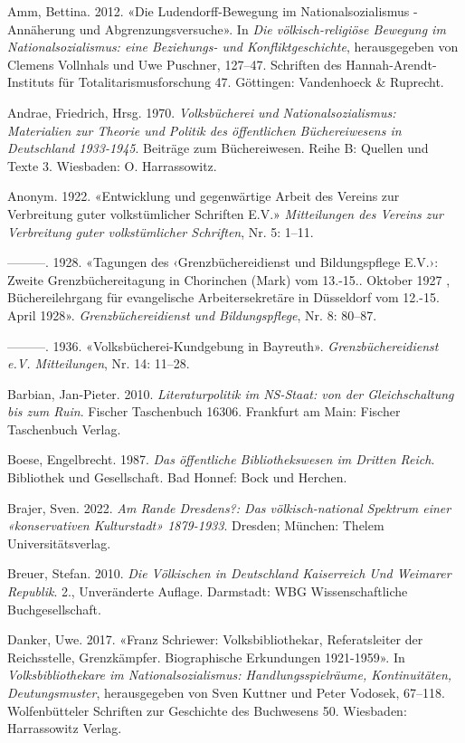 \documentclass[a4paper,
fontsize=11pt,
oneside,
numbers=noperiodatend,
parskip=half-,
bibliography=totoc,
final
]{scrartcl}
\begin{document}
Amm, Bettina. 2012. «Die Ludendorff-Bewegung im Nationalsozialismus -
Annäherung und Abgrenzungsversuche». In \emph{Die völkisch-religiöse
Bewegung im Nationalsozialismus: eine Beziehungs- und
Konfliktgeschichte}, herausgegeben von Clemens Vollnhals und Uwe
Puschner, 127--47. Schriften des Hannah-Arendt-Instituts für
Totalitarismusforschung 47. Göttingen: Vandenhoeck \& Ruprecht.

Andrae, Friedrich, Hrsg. 1970. \emph{Volksbücherei und
Nationalsozialismus: Materialien zur Theorie und Politik des
öffentlichen Büchereiwesens in Deutschland 1933-1945}. Beiträge zum
Büchereiwesen. Reihe B: Quellen und Texte 3. Wiesbaden: O. Harrassowitz.

Anonym. 1922. «Entwicklung und gegenwärtige Arbeit des Vereins zur
Verbreitung guter volkstümlicher Schriften E.V.» \emph{Mitteilungen des
Vereins zur Verbreitung guter volkstümlicher Schriften}, Nr. 5: 1--11.

---------. 1928. «Tagungen des ‹Grenzbüchereidienst und Bildungspflege
E.V.›: Zweite Grenzbüchereitagung in Chorinchen (Mark) vom 13.-15..
Oktober 1927 , Büchereilehrgang für evangelische Arbeitersekretäre in
Düsseldorf vom 12.-15. April 1928». \emph{Grenzbüchereidienst und
Bildungspflege}, Nr. 8: 80--87.

---------. 1936. «Volksbücherei-Kundgebung in Bayreuth».
\emph{Grenzbüchereidienst e.V. Mitteilungen}, Nr. 14: 11--28.

Barbian, Jan-Pieter. 2010. \emph{Literaturpolitik im NS-Staat: von der
Gleichschaltung bis zum Ruin}. Fischer Taschenbuch 16306. Frankfurt am
Main: Fischer Taschenbuch Verlag.

Boese, Engelbrecht. 1987. \emph{Das öffentliche Bibliothekswesen im
Dritten Reich}. Bibliothek und Gesellschaft. Bad Honnef: Bock und
Herchen.

Brajer, Sven. 2022. \emph{Am Rande Dresdens?: Das völkisch-national
Spektrum einer «konservativen Kulturstadt» 1879-1933}. Dresden; München:
Thelem Universitätsverlag.

Breuer, Stefan. 2010. \emph{Die Völkischen in Deutschland Kaiserreich
Und Weimarer Republik}. 2., Unveränderte Auflage. Darmstadt: WBG
Wissenschaftliche Buchgesellschaft.

Danker, Uwe. 2017. «Franz Schriewer: Volksbibliothekar, Referatsleiter
der Reichsstelle, Grenzkämpfer. Biographische Erkundungen 1921-1959». In
\emph{Volksbibliothekare im Nationalsozialismus: Handlungsspielräume,
Kontinuitäten, Deutungsmuster}, herausgegeben von Sven Kuttner und Peter
Vodosek, 67--118. Wolfenbütteler Schriften zur Geschichte des Buchwesens
50. Wiesbaden: Harrassowitz Verlag.
\end{document}
